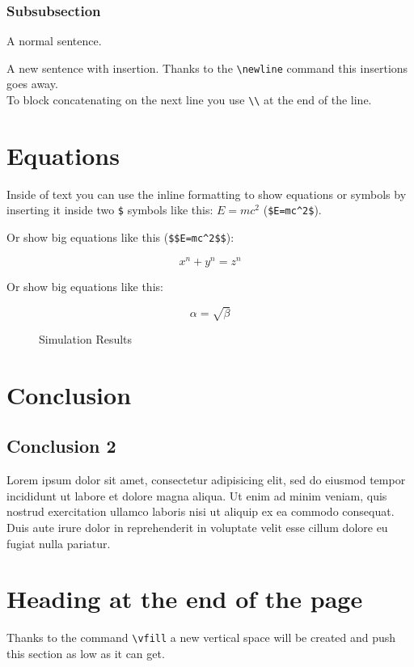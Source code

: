 \documentclass{article}				%
\begin{document}
\subsubsection{Subsubsection}
A normal sentence.

A new sentence with insertion.
\newline
Thanks to the \verb|\newline| command this insertions goes away.\\
To block concatenating on the next line you use \verb|\\| at the end of the line.

\section{Equations}

Inside of text you can use the inline formatting to show equations or symbols by inserting it inside two  \verb|$| symbols like this: $E=mc^2$ (\verb|$E=mc^2$|).

\vspace{5mm} %

Or show big equations like this (\verb|$$E=mc^2$$|):

$$x^n+y^n=z^n$$

Or show big equations like this:

\begin{equation}
\label{simple_equation}
\alpha = \sqrt{ \beta }
\end{equation}


\begin{figure}
    \centering
    \caption{Simulation Results}
    \label{simulationfigure}
\end{figure}

\newpage

\section{Conclusion}

\subsection{Conclusion 2}

Lorem ipsum dolor sit amet, consectetur adipisicing elit, sed do eiusmod tempor
incididunt ut labore et dolore magna aliqua. Ut enim ad minim veniam, quis
nostrud exercitation ullamco laboris nisi ut aliquip ex ea commodo consequat.
Duis aute irure dolor in reprehenderit in voluptate velit esse cillum dolore eu
fugiat nulla pariatur.

\vfill

\section{Heading at the end of the page}

Thanks to the command \verb|\vfill| a new vertical space will be created and push this section as low as it can get.

\end{document}
